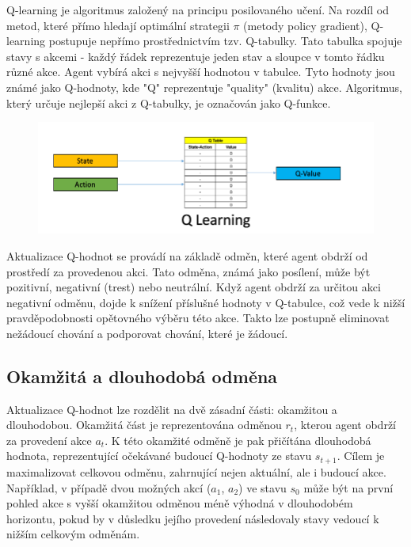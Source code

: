 \documentclass[12pt, a4paper,
twoside,        %
openright
]{report}
\begin{document}
Q-learning je algoritmus založený na principu posilovaného učení. Na rozdíl od metod, které přímo hledají optimální strategii $\pi$ (metody policy gradient), Q-learning postupuje nepřímo prostřednictvím tzv. Q-tabulky. Tato tabulka spojuje stavy s akcemi - každý řádek reprezentuje jeden stav a sloupce v tomto řádku různé akce. Agent vybírá akci s nejvyšší hodnotou v tabulce. Tyto hodnoty jsou známé jako Q-hodnoty, kde "Q" reprezentuje "quality" (kvalitu) akce. Algoritmus, který určuje nejlepší akci z Q-tabulky, je označován jako Q-funkce.
\begin{figure}[h]
	\centering
	\includegraphics[width=0.8\linewidth, height=0.8\linewidth, keepaspectratio]{image/qlearn2.png}
	
\end{figure}
Aktualizace Q-hodnot se provádí na základě odměn, které agent obdrží od prostředí za provedenou akci. Tato odměna, známá jako posílení, může být pozitivní, negativní (trest) nebo neutrální. Když agent obdrží za určitou akci negativní odměnu, dojde k snížení příslušné hodnoty v Q-tabulce, což vede k nižší pravděpodobnosti opětovného výběru této akce. Takto lze postupně eliminovat nežádoucí chování a podporovat chování, které je žádoucí.

\subsection{Okamžitá a dlouhodobá odměna}
Aktualizace Q-hodnot lze rozdělit na dvě zásadní části: okamžitou a dlouhodobou. Okamžitá část je reprezentována odměnou $r_{t}$, kterou agent obdrží za provedení akce $a_{t}$. K této okamžité odměně je pak přičítána dlouhodobá hodnota, reprezentující očekávané budoucí Q-hodnoty ze stavu $s_{t+1}$. Cílem je maximalizovat celkovou odměnu, zahrnující nejen aktuální, ale i budoucí akce. Například, v případě dvou možných akcí ($a_{1}$, $a_{2}$) ve stavu $s_{0}$ může být na první pohled akce s vyšší okamžitou odměnou méně výhodná v dlouhodobém horizontu, pokud by v důsledku jejího provedení následovaly stavy vedoucí k nižším celkovým odměnám.
\end{document}
